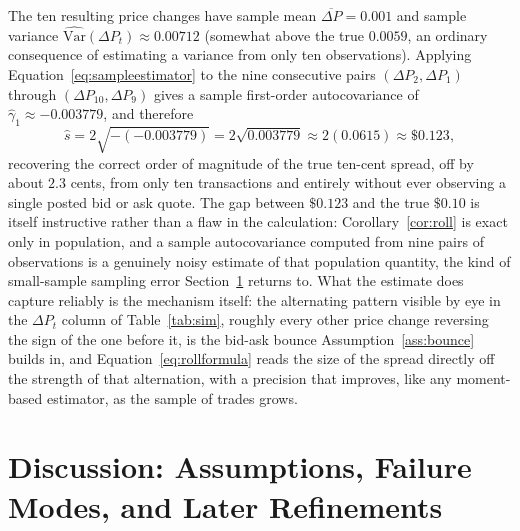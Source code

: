 \documentclass[11pt]{article}
\theoremstyle{remark}
\theoremstyle{definition}
\begin{document}
The ten resulting price changes have sample mean $\overline{\Delta P} = 0.001$ and sample variance $\widehat{\mathrm{Var}}(\Delta P_t) \approx 0.00712$ (somewhat above the true $0.0059$, an ordinary consequence of estimating a variance from only ten observations). Applying Equation~\eqref{eq:sampleestimator} to the nine consecutive pairs $(\Delta P_2,\Delta P_1)$ through $(\Delta P_{10},\Delta P_9)$ gives a sample first-order autocovariance of $\hat\gamma_1 \approx -0.003779$, and therefore
\begin{equation}
\hat s = 2\sqrt{-(-0.003779)} = 2\sqrt{0.003779} \approx 2(0.0615) \approx \$0.123,
\end{equation}
recovering the correct order of magnitude of the true ten-cent spread, off by about $2.3$ cents, from only ten transactions and entirely without ever observing a single posted bid or ask quote. The gap between $\$0.123$ and the true $\$0.10$ is itself instructive rather than a flaw in the calculation: Corollary~\ref{cor:roll} is exact only in population, and a sample autocovariance computed from nine pairs of observations is a genuinely noisy estimate of that population quantity, the kind of small-sample sampling error Section~\ref{sec:discussion} returns to. What the estimate does capture reliably is the mechanism itself: the alternating pattern visible by eye in the $\Delta P_t$ column of Table~\ref{tab:sim}, roughly every other price change reversing the sign of the one before it, is the bid-ask bounce Assumption~\ref{ass:bounce} builds in, and Equation~\eqref{eq:rollformula} reads the size of the spread directly off the strength of that alternation, with a precision that improves, like any moment-based estimator, as the sample of trades grows.

\section{Discussion: Assumptions, Failure Modes, and Later Refinements}
\label{sec:discussion}
\end{document}
